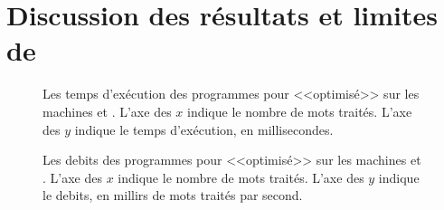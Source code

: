 %
%
%


\section{Discussion des résultats et limites de \ppff}



\begin{figure}


\caption[Les temps d'exécution des programmes pour 
<<optimisé>> sur les machines  et .]{Les temps d'exécution des
programmes pour  <<optimisé>> sur les machines  et
. L'axe des $x$ indique le nombre de mots traités. L'axe des $y$
indique le temps d'exécution, en millisecondes.}
\label{WordCount-merged-temps.fig}
\end{figure}

\begin{figure}


\caption[Les debits des programmes pour 
<<optimisé>> sur les machines  et .]{Les debits des
programmes pour  <<optimisé>> sur les machines  et
. L'axe des $x$ indique le nombre de mots traités. L'axe des $y$
indique le debits, en millirs de mots traités par second.}
\label{WordCount-merged-debit.fig}
\end{figure}
